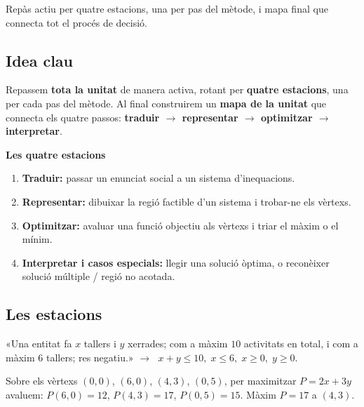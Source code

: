 %
{Repàs actiu per quatre estacions, una per pas del mètode, i mapa final que connecta tot el procés de decisió.}

\subsection{Idea clau}

Repassem \textbf{tota la unitat} de manera activa, rotant per \textbf{quatre
estacions}, una per cada pas del mètode. Al final construirem un \textbf{mapa de la
unitat} que connecta els quatre passos: \textbf{traduir $\rightarrow$ representar
$\rightarrow$ optimitzar $\rightarrow$ interpretar}.

\begin{idea}
\textbf{Les quatre estacions}
\begin{enumerate}[leftmargin=1.6em, itemsep=2pt]
  \item \textbf{Traduir:} passar un enunciat social a un sistema d'inequacions.
  \item \textbf{Representar:} dibuixar la regió factible d'un sistema i trobar-ne els
        vèrtexs.
  \item \textbf{Optimitzar:} avaluar una funció objectiu als vèrtexs i triar el màxim
        o el mínim.
  \item \textbf{Interpretar i casos especials:} llegir una solució òptima, o reconèixer
        solució múltiple / regió no acotada.
\end{enumerate}
\end{idea}

\subsection{Les estacions}

\begin{exemple}
«Una entitat fa $x$ tallers i $y$ xerrades; com a màxim $10$ activitats en total, i com
a màxim $6$ tallers; res negatiu.» $\rightarrow$ $\;x+y\le 10,\;x\le 6,\;x\ge 0,\;y\ge 0$.
\end{exemple}

\begin{exemple}
Sobre els vèrtexs $(0,0)$, $(6,0)$, $(4,3)$, $(0,5)$, per maximitzar $P=2x+3y$
avaluem: $P(6,0)=12$, $P(4,3)=17$, $P(0,5)=15$. Màxim $P=17$ a $(4,3)$.
\end{exemple}

